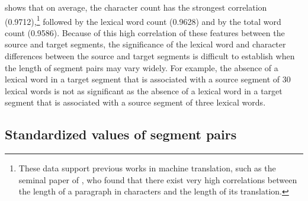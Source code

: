 \documentclass[output=paper]{langsci/langscibook}
\begin{document}
\begin{table}\caption{Correlation of three linguistic features in English-Spanish translations}\label{ep:tcorr}
\end{table}

 shows that on average, the character count has the strongest correlation (0.9712),\footnote{These data support previous works in machine translation, such as the seminal paper of \textcite[89]{galchu93}, who found that there exist very high correlations between the length of a paragraph in characters and the length of its translation.} followed by the lexical word count (0.9628) and by the total word count (0.9586). Because of this high correlation of these features between the source and target segments, the significance of the lexical word and character differences between the source and target segments is difficult to establish when the length of segment pairs may vary widely. For example, the absence of a lexical word in a target segment that is associated with a source segment of 30 lexical words is not as significant as the absence of a lexical word in a target segment that is associated with a source segment of three lexical words.

\subsection{Standardized values of segment pairs}
\end{document}
